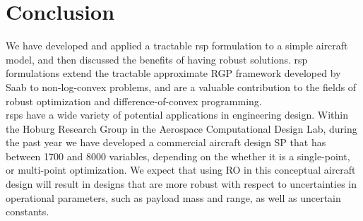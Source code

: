 \section{Conclusion}

We have developed and applied a tractable \gls{rsp} formulation to a simple aircraft model,
and then discussed the benefits of having robust solutions. \gls{rsp} formulations extend
the tractable approximate RGP framework developed by Saab to non-log-convex problems,
and are a valuable contribution to the fields of robust optimization and difference-of-convex programming.\\

\gls{rsp}s have a wide variety of potential applications in engineering design.
Within the Hoburg Research Group in the Aerospace Computational Design Lab, during the past year we
have developed a commercial aircraft design SP that has between 1700 and 8000 variables,
depending on the whether it is a single-point, or multi-point optimization.
We expect that using RO in this conceptual aircraft design will result in designs
that are more robust with respect to uncertainties in operational parameters,
such as payload mass and range, as well as uncertain constants.


